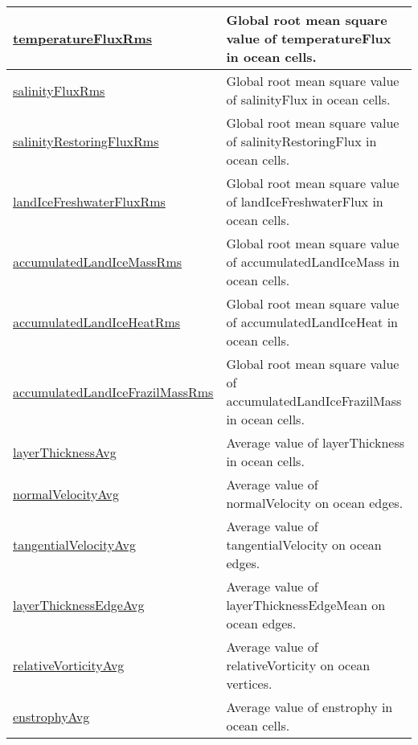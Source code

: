 {\begin{center}
\begin{longtable}{| p{2.0in} | p{4.0in} |}
    \hline
    \hyperref[subsec:var_sec_globalStatsAM_temperatureFluxRms]{temperatureFluxRms} & Global root mean square value of temperatureFlux in ocean cells. \\
    \hline
    \hyperref[subsec:var_sec_globalStatsAM_salinityFluxRms]{salinityFluxRms} & Global root mean square value of salinityFlux in ocean cells. \\
    \hline
    \hyperref[subsec:var_sec_globalStatsAM_salinityRestoringFluxRms]{salinityRestoringFluxRms} & Global root mean square value of salinityRestoringFlux in ocean cells. \\
    \hline
    \hyperref[subsec:var_sec_globalStatsAM_landIceFreshwaterFluxRms]{landIceFreshwaterFluxRms} & Global root mean square value of landIceFreshwaterFlux in ocean cells. \\
    \hline
    \hyperref[subsec:var_sec_globalStatsAM_accumulatedLandIceMassRms]{accumulatedLandIceMassRms} & Global root mean square value of accumulatedLandIceMass in ocean cells. \\
    \hline
    \hyperref[subsec:var_sec_globalStatsAM_accumulatedLandIceHeatRms]{accumulatedLandIceHeatRms} & Global root mean square value of accumulatedLandIceHeat in ocean cells. \\
    \hline
    \hyperref[subsec:var_sec_globalStatsAM_accumulatedLandIceFrazilMassRms]{accumulatedLandIceFrazilMass\-Rms} & Global root mean square value of accumulatedLandIceFrazilMass in ocean cells. \\
    \hline
    \hyperref[subsec:var_sec_globalStatsAM_layerThicknessAvg]{layerThicknessAvg} & Average value of layerThickness in ocean cells. \\
    \hline
    \hyperref[subsec:var_sec_globalStatsAM_normalVelocityAvg]{normalVelocityAvg} & Average value of normalVelocity on ocean edges. \\
    \hline
    \hyperref[subsec:var_sec_globalStatsAM_tangentialVelocityAvg]{tangentialVelocityAvg} & Average value of tangentialVelocity on ocean edges. \\
    \hline
    \hyperref[subsec:var_sec_globalStatsAM_layerThicknessEdgeAvg]{layerThicknessEdgeAvg} & Average value of layerThicknessEdgeMean on ocean edges. \\
    \hline
    \hyperref[subsec:var_sec_globalStatsAM_relativeVorticityAvg]{relativeVorticityAvg} & Average value of relativeVorticity on ocean vertices. \\
    \hline
    \hyperref[subsec:var_sec_globalStatsAM_enstrophyAvg]{enstrophyAvg} & Average value of enstrophy in ocean cells. \\

\end{longtable}
\end{center}}
